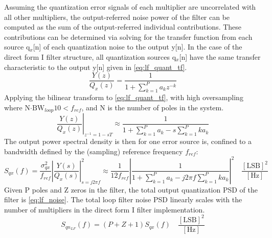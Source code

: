 	Assuming the quantization error signals of each multiplier are uncorrelated with all other multipliers, the output-referred noise power of the filter can be computed as the sum of the output-referred individual contributions. These contributions can be determined via solving for the transfer function from each source q$_x$[n] of each quantization noise to the output y[n]. In the case of the direct form I filter structure, all quantization sources q$_x$[n] have the same transfer characteristic to the output y[n] given in \ref{eq:lf_quant_tf}.
	\begin{equation}
		\frac{Y(z)}{Q_x(z)} = \frac{1}{1+\sum_{k=1}^P a_kz^{-k}}\label{eq:lf_quant_tf}
	\end{equation}
	Applying the bilinear transform to \ref{eq:lf_quant_tf}, with high oversampling where N$\cdot \text{BW}_{loop} 10 < f_{ref}$, and N is the number of poles in the system.
	\begin{equation}
		\left.\frac{Y(z)}{Q_x(z)}\right\vert_{z^{-1}=1-sT} \approx \frac{1}{1+\sum_{k=1}^P a_k - s\sum_{k=1}^P ka_k}\label{eq:lf_quant_tf_s}
	\end{equation}
	The output power spectral density is then for one error source is, confined to a bandwidth defined by the (sampling) reference frequency $f_{ref}$:
	\begin{equation}
		S_{qx}(f) = \frac{\sigma_{qx}^2}{f_{ref}}\left|\frac{Y(s)}{Q_x(s)}\right|^2_{s=j2\pi f} \approx \frac{1}{12f_{ref}}\left|\frac{1}{1+\sum_{k=1}^P a_k - j2\pi f\sum_{k=1}^P ka_k}\right|^2 \hspace{1em}\frac{[\text{LSB}]^2}{[\text{Hz}]}
	\end{equation}
	Given P poles and Z zeros in the filter, the total output quantization PSD of the filter is \ref{eq:lf_noise}. The total loop filter noise PSD linearly scales with the number of multipliers in the direct form I filter implementation.
	\begin{equation}
		S_{qn_{LF}}(f) = (P+Z+1)S_{qx}(f) \hspace{1em}\frac{[\text{LSB}]^2}{[\text{Hz}]}\label{eq:lf_noise}
	\end{equation}


